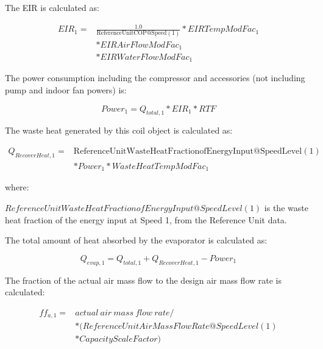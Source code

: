 The EIR is calculated as:

\begin{equation}
  \begin{array}{rl}
    EIR_1 =& \frac{1.0}{\mathrm{ReferenceUnitCOP@Speed(1)}} * EIRTempModFac_1 \\
          &* EIRAirFlowModFac_1 \\
          &* EIRWaterFlowModFac_1
  \end{array}
\end{equation}

The power consumption including the compressor and accessories (not including pump and indoor fan powers) is:

\begin{equation}
Powe{r_1} = {Q_{total,1}}*EI{R_1}*RTF
\end{equation}

The waste heat generated by this coil object is calculated as:

\begin{equation}
  \begin{array}{rl}
    Q_{RecoverHeat,1} =& \mathrm{ReferenceUnitWasteHeatFractionofEnergyInput@SpeedLevel(1)} \\
                       &* Power_1 * WasteHeatTempModFac_1
  \end{array}
\end{equation}

where:

\(ReferenceUnitWasteHeatFractionofEnergyInput@SpeedLevel\left( 1 \right)\) is the waste heat fraction of the energy input at Speed 1, from the Reference Unit data.

The total amount of heat absorbed by the evaporator is calculated as:

\begin{equation}
{{Q}_{evap,1}} = {Q_{total,1}} + {{Q}_{RecoverHeat,1}} - Powe{r_1}
\end{equation}

The fraction of the actual air mass flow to the design air mass flow rate is calculated:

\begin{equation}
\begin{array}{rl}
  ff_{a,1} =& actual~air~mass~flow~rate/ \\
  &*(ReferenceUnitAirMassFlowRate@SpeedLevel(1) \\
  &*CapacityScaleFactor)
\end{array}
\end{equation}

